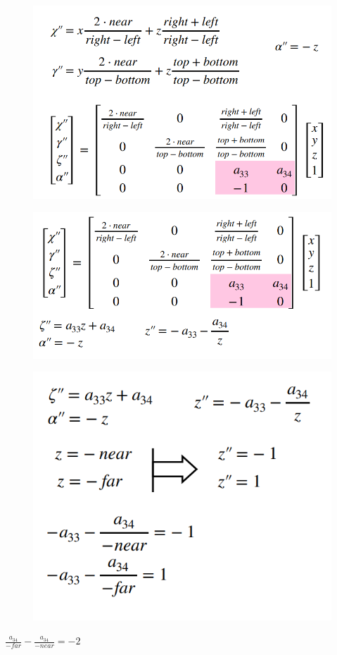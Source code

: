 \documentclass{article}
\begin{document}
\begin{figure} [H]
    \includegraphics[width=0.70\linewidth]{Снимок экрана 2025-04-07 123325.png}
\end{figure}

\begin{figure} [H]
    \includegraphics[width=0.70\linewidth]{Снимок экрана 2025-04-07 123353.png}
\end{figure}

\begin{figure} [H]
    \includegraphics[width=0.70\linewidth]{Снимок экрана 2025-04-07 123428.png}
\end{figure}


$\frac{a_{34}}{-far} - \frac{a_{34}}{-near} = -2$
\end{document}
